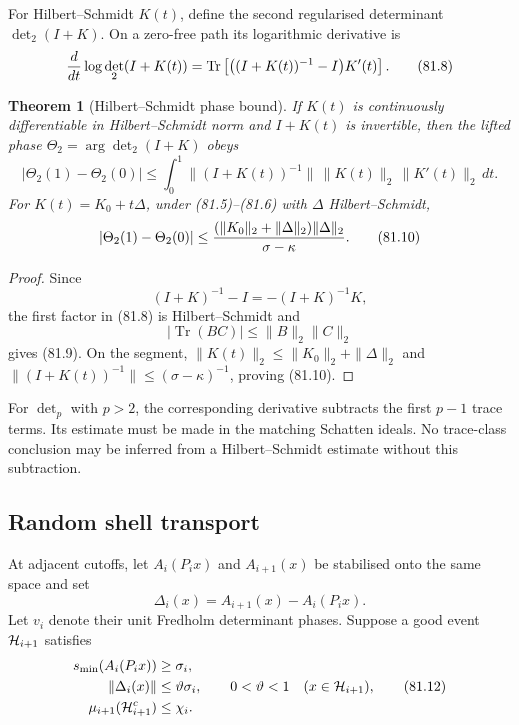 \documentclass[11pt]{article}
\newtheorem{theorem}{Theorem}[section]
\begin{document}
For Hilbert--Schmidt \(K(t)\), define the second regularised
determinant \(\det_2(I+K)\).  On a zero-free path its logarithmic
derivative is
\[
 {d\over dt}\log\det_2(I+K(t))
 =
 \operatorname{Tr}\left[
 \big((I+K(t))^{-1}-I\big)K'(t)\right].                      \tag{81.8}
\]

\begin{theorem}[Hilbert--Schmidt phase bound]
\label{thm:v11v81-det2}
If \(K(t)\) is continuously differentiable in Hilbert--Schmidt norm
and \(I+K(t)\) is invertible, then the lifted phase
\(\Theta_2=\arg\det_2(I+K)\) obeys
\[
 |\Theta_2(1)-\Theta_2(0)|
 \le\int_0^1
 \|(I+K(t))^{-1}\|\,\|K(t)\|_2\,\|K'(t)\|_2\,dt.             \tag{81.9}
\]
For \(K(t)=K_0+t\Delta\), under (81.5)--(81.6) with
\(\Delta\) Hilbert--Schmidt,
\[
 |\Theta_2(1)-\Theta_2(0)|
 \le {(\|K_0\|_2+\|\Delta\|_2)\|\Delta\|_2
             \over\sigma-\kappa}.                           \tag{81.10}
\]
\end{theorem}

\begin{proof}
Since
\[
 (I+K)^{-1}-I=-(I+K)^{-1}K,
\]
the first factor in (81.8) is Hilbert--Schmidt and
\[
 |\operatorname{Tr}(BC)|\le\|B\|_2\|C\|_2
\]
gives (81.9).  On the segment,
\(\|K(t)\|_2\le\|K_0\|_2+\|\Delta\|_2\) and
\(\|(I+K(t))^{-1}\|\le(\sigma-\kappa)^{-1}\), proving (81.10).
\end{proof}

For \(\det_p\) with \(p>2\), the corresponding derivative subtracts
the first \(p-1\) trace terms.  Its estimate must be made in the
matching Schatten ideals.  No trace-class conclusion may be inferred
from a Hilbert--Schmidt estimate without this subtraction.

\subsection{Random shell transport}

At adjacent cutoffs, let \(A_i(P_ix)\) and \(A_{i+1}(x)\) be stabilised
onto the same space and set
\[
                  \Delta_i(x)=A_{i+1}(x)-A_i(P_ix).          \tag{81.11}
\]
Let \(v_i\) denote their unit Fredholm determinant phases.  Suppose a
good event \({\cal H}_{i+1}\) satisfies
\[
 \begin{split}
 s_{\min}(A_i(P_ix))&\ge\sigma_i,\\
 \|\Delta_i(x)\|&\le\vartheta\sigma_i,
                  \qquad 0<\vartheta<1
                  \quad(x\in{\cal H}_{i+1}),                 \tag{81.12}\\
 \mu_{i+1}({\cal H}_{i+1}^c)&\le\chi_i.
 \end{split}
\]
\end{document}
